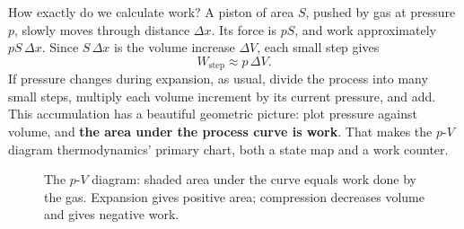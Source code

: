 \begin{mainline}
How exactly do we calculate work? A piston of area \(S\), pushed by gas at pressure \(p\), slowly moves through distance \(\Delta x\). Its force is \(pS\), and work approximately \(pS\,\Delta x\). Since \(S\,\Delta x\) is the volume increase \(\Delta V\), each small step gives
\[
  W_{\text{step}} \approx p\,\Delta V .
\]
If pressure changes during expansion, as usual, divide the process into many small steps, multiply each volume increment by its current pressure, and add. This accumulation has a beautiful geometric picture: plot pressure against volume, and \textbf{the area under the process curve is work}. That makes the \(p\)-\(V\) diagram thermodynamics' primary chart, both a state map and a work counter.
\end{mainline}

\begin{figure}[htbp]
\centering
{}
\caption{The \(p\)-\(V\) diagram: shaded area under the curve equals work done by the gas. Expansion gives positive area; compression decreases volume and gives negative work.}
\end{figure}

